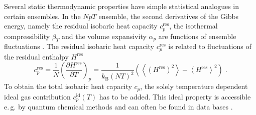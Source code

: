 
Several static thermodynamic properties have simple statistical analogues in certain ensembles. In the $NpT$ ensemble, the second derivatives of the Gibbs energy, namely the residual isobaric heat capacity $c^{\text{res}}_{{p}}$, the isothermal compressibility $\beta_{T}$ and the volume expansivity $\alpha_{{p}}$ are functions of ensemble fluctuations \parencite{Allen}. The residual isobaric heat capacity $c^{\text{res}}_{{p}}$ is related to fluctuations of the residual enthalpy $H^{\text{res}}$
\begin{equation}
c^{\text{res}}_{p}=\frac{1}{N} \left(\frac{\partial H^{\text{res}}}{\partial T}\right)_{p} = \frac{1}{k_{\text{B}}\left(NT\right)^{2}} \left(\left\langle \left(H^{\text{res}}\right)^{2}\right\rangle-\left\langle H^{\text{res}}\right\rangle ^{2}\right) \;.
\label{eq:isobaricheatcapacity}
\end{equation}
To obtain the total isobaric heat capacity $c_{p}$, the solely temperature dependent ideal gas contribution $c^{\text{id}}_{p} \left(T\right)$ has to be added. This ideal property is accessible e.\,g. by quantum chemical methods and can often be found in data bases \parencite{rowley}.

